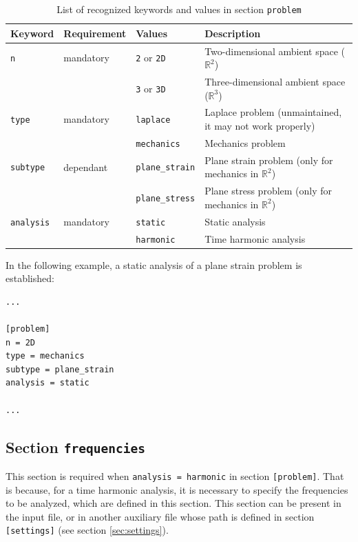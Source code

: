 \documentclass[a4paper,fleqn]{book}
\begin{document}
\begin{table}[h]
\centering
{\footnotesize
\begin{tabular}{llll}
\textbf{Keyword} & \textbf{Requirement} & \textbf{Values} & \textbf{Description} \\
\midrule
\texttt{n} & mandatory & \texttt{2} or \texttt{2D} & Two-dimensional ambient space ($\mathbb{R}^2$)   \\
           &           & \texttt{3} or \texttt{3D} & Three-dimensional ambient space ($\mathbb{R}^3$) \\
\midrule
\texttt{type} & mandatory & \texttt{laplace} & Laplace problem (unmaintained, it may not work properly)     \\
              &           & \texttt{mechanics} & Mechanics problem \\
\midrule
\texttt{subtype} & dependant & \texttt{plane\_strain} & Plane strain problem (only for mechanics in $\mathbb{R}^2$) \\
                 &           & \texttt{plane\_stress} & Plane stress problem (only for mechanics in $\mathbb{R}^2$) \\          
\midrule
\texttt{analysis} & mandatory & \texttt{static}   & Static analysis        \\
                  &           & \texttt{harmonic} & Time harmonic analysis \\    
\end{tabular}
\caption{List of recognized keywords and values in section \texttt{problem}}
\label{tab:problem}
}
\end{table}

In the following example, a static analysis of a plane strain problem is established:
\begin{Verbatim}[frame=single, fontsize=\small, label=input.dat]
...

[problem]
n = 2D
type = mechanics
subtype = plane_strain
analysis = static

...
\end{Verbatim}

\subsection{Section \texttt{frequencies}}

This section is required when \texttt{analysis = harmonic} in section \texttt{[problem]}. That is because, for a time harmonic analysis, it is necessary to specify the frequencies to be analyzed, which are defined in this section. This section can be present in the input file, or in another auxiliary file whose path is defined in section  \texttt{[settings]} (see section \ref{sec:settings}).
\end{document}
